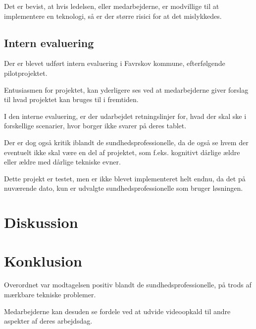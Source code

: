 Det er bevist, at hvis ledelsen, eller medarbejderne, er modvillige til at implementere en teknologi, så er der større risici for at det mislykkedes. 

\subsection{Intern evaluering}
Der er blevet udført intern evaluering i Favrskov kommune, efterfølgende pilotprojektet. 

Entusiasmen for projektet, kan yderligere ses ved at medarbejderne giver forslag til hvad projektet kan bruges til i fremtiden.

I den interne evaluering, er der udarbejdet retningslinjer for, hvad der skal ske i forskellige scenarier, hvor borger ikke svarer på deres tablet. 

Der er dog også kritik iblandt de sundhedsprofessionelle, da de også se hvem der eventuelt ikke skal være en del af projektet, som f.eks. kognitivt dårlige ældre eller ældre med dårlige tekniske evner. 

Dette projekt er testet, men er ikke blevet implementeret helt endnu, da det på nuværende dato, kun er udvalgte sundhedsprofessionelle som bruger løsningen. 


  
\section{Diskussion}

\section{Konklusion}
Overordnet var modtagelsen positiv blandt de sundhedsprofessionelle, på trods af mærkbare tekniske problemer.

Medarbejderne kan desuden se fordele ved at udvide videoopkald til andre aspekter af deres arbejdsdag.  
